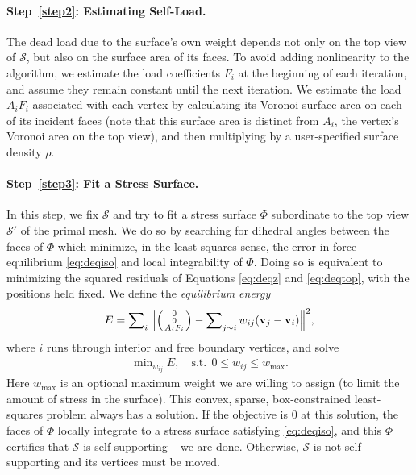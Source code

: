 \documentclass[review]{acmsiggraph}
\makeatletter
\def\Forcevector{\Big(\mbox{\scriptsize
	\def\arraystretch{0.8}\begin{tabular}{@{\,}c@{\,}}
	0 \\ 0 \\ $A_i F_i$
	\end{tabular}}\Big)}
\def\SS{{\mathcal S}}
\makeatother
\begin{document}
\paragraph{Step~\ref{step2}: Estimating Self-Load.}

The dead load due to the surface's own weight depends not only on the top
view of $\SS$, but also on the surface area of its faces. To avoid adding
nonlinearity to the algorithm, we estimate the load coefficients $F_i$ at
the beginning of each iteration, and assume they remain constant until the
next iteration. We estimate the load $A_iF_i$ associated with each
vertex by calculating its Voronoi surface area on each of its incident faces
(note that this surface area is distinct from $A_i$, the vertex's Voronoi
area on the top view), and then multiplying by a user-specified surface density $\rho$.

\paragraph{Step~\ref{step3}: Fit a Stress Surface.}

In this step, we fix $\SS$ and try to fit a stress surface $\Phi$
subordinate to the top view $\SS'$ of the primal mesh. We do so by
searching for dihedral angles between the faces of $\Phi$ which minimize,
in the least-squares sense, the error in force equilibrium
\eqref{eq:deqiso} and local integrability of $\Phi$. Doing so is
equivalent to minimizing the squared residuals of Equations
\eqref{eq:deqz} and \eqref{eq:deqtop}, with the positions
held fixed. We define the {\em equilibrium energy}
	\begin{align}
	E = \sum\nolimits_i \Big\| \Forcevector -
		\sum\nolimits_{j\sim i} w_{ij} (\vw_j-\vw_i) \Big\|^2,
	\label{eq:eenergy}
	\end{align}
 where $i$ runs through interior and free boundary vertices, and
solve
	\begin{align}
	\min\nolimits_{w_{ij}} E,
	\quad
	\textrm{s.t.}\ \
		0 \leq w_{ij} \leq w_{\max}.
	\label{eq:wbounds}
	\end{align}
 Here $w_{\max}$ is an optional maximum weight we are willing to assign
(to limit the amount of stress in the surface). This convex, sparse,
box-constrained least-squares problem \cite{BCLS} always has a solution.
If the objective is $0$ at this solution, the faces of $\Phi$ locally
integrate to a stress surface satisfying \eqref{eq:deqiso}, and this $\Phi$
certifies that $\SS$ is self-supporting -- we are done. Otherwise, $\SS$
is not self-supporting and its vertices must be moved.
\end{document}
